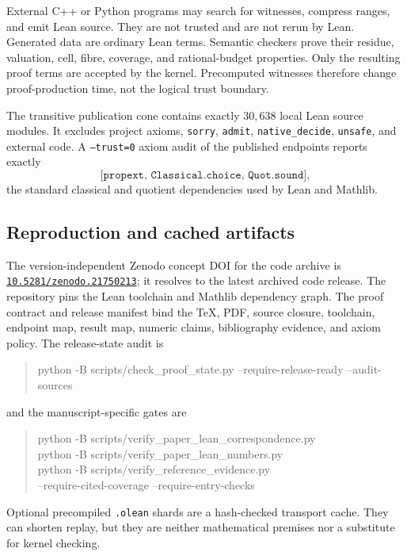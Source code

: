 \documentclass[11pt]{article}
\theoremstyle{definition}
\begin{document}
External C++ or Python programs may search for witnesses, compress ranges,
and emit Lean source.  They are not trusted and are not rerun by Lean.
Generated data are ordinary Lean terms.  Semantic checkers prove their
residue, valuation, cell, fibre, coverage, and rational-budget properties.
Only the resulting proof terms are accepted by the kernel.  Precomputed
witnesses therefore change proof-production time, not the logical trust
boundary.

The transitive publication cone contains exactly $30{,}638$ local Lean source
modules.  It excludes project axioms, \texttt{sorry}, \texttt{admit},
\texttt{native\_decide}, \texttt{unsafe}, and external code.  A
\texttt{--trust=0} axiom audit of the published endpoints reports exactly
\[
 \texttt{[propext, Classical.choice, Quot.sound]},
\]
the standard classical and quotient dependencies used by Lean and Mathlib.

\subsection*{Reproduction and cached artifacts}

The version-independent Zenodo concept DOI for the code archive is
\href{https://doi.org/10.5281/zenodo.21750213}%
{\nolinkurl{10.5281/zenodo.21750213}}; it resolves to the latest archived
code release.  The repository pins the Lean toolchain and Mathlib dependency
graph.  The proof contract and release manifest bind the TeX, PDF, source
closure,
toolchain, endpoint map, result map, numeric claims, bibliography evidence,
and axiom policy.  The release-state audit is
\begin{quote}\scriptsize\ttfamily
python -B scripts/check\_proof\_state.py
  --require-release-ready --audit-sources
\end{quote}
and the manuscript-specific gates are
\begin{quote}\scriptsize\ttfamily
python -B scripts/verify\_paper\_lean\_correspondence.py\\
python -B scripts/verify\_paper\_lean\_numbers.py\\
python -B scripts/verify\_reference\_evidence.py\\
\hspace*{2em}--require-cited-coverage --require-entry-checks
\end{quote}
Optional precompiled \texttt{.olean} shards are a hash-checked transport
cache.  They can shorten replay, but they are neither mathematical premises
nor a substitute for kernel checking.
\end{document}
